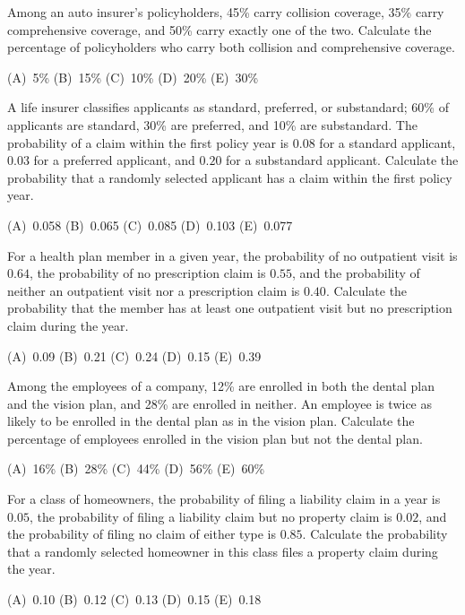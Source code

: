 \begin{practice}
Among an auto insurer's policyholders, 45\% carry collision coverage, 35\% carry comprehensive
coverage, and 50\% carry exactly one of the two.
Calculate the percentage of policyholders who carry both collision and comprehensive coverage.
\par\smallskip\noindent (A)~5\% \quad (B)~15\% \quad (C)~10\% \quad (D)~20\% \quad (E)~30\%
\end{practice}

\begin{practice}
A life insurer classifies applicants as standard, preferred, or substandard; 60\% of applicants are
standard, 30\% are preferred, and 10\% are substandard. The probability of a claim within the
first policy year is $0.08$ for a standard applicant, $0.03$ for a preferred applicant, and $0.20$
for a substandard applicant.
Calculate the probability that a randomly selected applicant has a claim within the first policy
year.
\par\smallskip\noindent (A)~0.058 \quad (B)~0.065 \quad (C)~0.085 \quad (D)~0.103 \quad (E)~0.077
\end{practice}

\begin{practice}
For a health plan member in a given year, the probability of no outpatient visit is $0.64$, the
probability of no prescription claim is $0.55$, and the probability of neither an outpatient visit
nor a prescription claim is $0.40$.
Calculate the probability that the member has at least one outpatient visit but no prescription
claim during the year.
\par\smallskip\noindent (A)~0.09 \qquad (B)~0.21 \qquad (C)~0.24 \qquad (D)~0.15 \qquad (E)~0.39
\end{practice}

\begin{practice}
Among the employees of a company, 12\% are enrolled in both the dental plan and the vision plan,
and 28\% are enrolled in neither. An employee is twice as likely to be enrolled in the dental plan
as in the vision plan.
Calculate the percentage of employees enrolled in the vision plan but not the dental plan.
\par\smallskip\noindent (A)~16\% \qquad (B)~28\% \qquad (C)~44\% \qquad (D)~56\% \qquad (E)~60\%
\end{practice}

\begin{practice}
For a class of homeowners, the probability of filing a liability claim in a year is $0.05$, the
probability of filing a liability claim but no property claim is $0.02$, and the probability of
filing no claim of either type is $0.85$.
Calculate the probability that a randomly selected homeowner in this class files a property claim
during the year.
\par\smallskip\noindent (A)~0.10 \qquad (B)~0.12 \qquad (C)~0.13 \qquad (D)~0.15 \qquad (E)~0.18
\end{practice}

